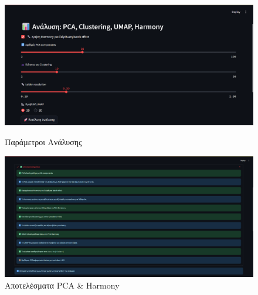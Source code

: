 \begin{figure}[!htb]
  \centering
  \begin{minipage}[t]{0.46\textwidth}
    \centering
    \includegraphics[width=\textwidth]{images/Analysis.png}
    \caption*{\small Παράμετροι Ανάλυσης}
  \end{minipage}
  \hfill
  \begin{minipage}[t]{0.46\textwidth}
    \centering
    \includegraphics[width=\textwidth]{images/Analysis_Results1.png}
    \caption*{\small Αποτελέσματα \foreignlanguage{english}{PCA \& Harmony}}
  \end{minipage}
\end{figure}

